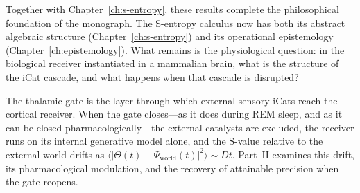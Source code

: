 Together with Chapter~\ref{ch:s-entropy}, these results complete the philosophical foundation of the monograph. The S-entropy calculus now has both its abstract algebraic structure (Chapter~\ref{ch:s-entropy}) and its operational epistemology (Chapter~\ref{ch:epistemology}). What remains is the physiological question: in the biological receiver instantiated in a mammalian brain, what is the structure of the iCat cascade, and what happens when that cascade is disrupted?

The thalamic gate is the layer through which external sensory iCats reach the cortical receiver. When the gate closes---as it does during REM sleep, and as it can be closed pharmacologically---the external catalysts are excluded, the receiver runs on its internal generative model alone, and the S-value relative to the external world drifts as $\langle |\Theta(t) - \Psi_{\mathrm{world}}(t)|^2 \rangle \sim Dt$. Part~II examines this drift, its pharmacological modulation, and the recovery of attainable precision when the gate reopens.
